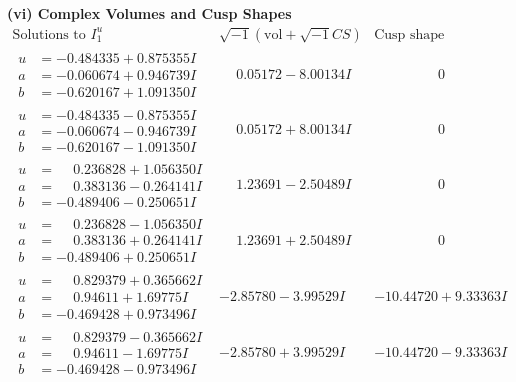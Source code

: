 \documentclass[1p]{elsarticle_modified}
\theoremstyle{definition}
\newcommand{\I}{\sqrt{-1}}
\begin{document}
\newpage\flushleft \textbf{(vi) Complex Volumes and Cusp Shapes}
$$\begin{array}{c|c|c}  
\text{Solutions to }I^u_{1}& \I (\text{vol} + \sqrt{-1}CS) & \text{Cusp shape}\\
 \hline 
\begin{aligned}
u &= -0.484335 + 0.875355 I \\
a &= -0.060674 + 0.946739 I \\
b &= -0.620167 + 1.091350 I\end{aligned}
 & \phantom{-}0.05172 - 8.00134 I & \phantom{-0.000000 } 0 \\ \hline\begin{aligned}
u &= -0.484335 - 0.875355 I \\
a &= -0.060674 - 0.946739 I \\
b &= -0.620167 - 1.091350 I\end{aligned}
 & \phantom{-}0.05172 + 8.00134 I & \phantom{-0.000000 } 0 \\ \hline\begin{aligned}
u &= \phantom{-}0.236828 + 1.056350 I \\
a &= \phantom{-}0.383136 - 0.264141 I \\
b &= -0.489406 - 0.250651 I\end{aligned}
 & \phantom{-}1.23691 - 2.50489 I & \phantom{-0.000000 } 0 \\ \hline\begin{aligned}
u &= \phantom{-}0.236828 - 1.056350 I \\
a &= \phantom{-}0.383136 + 0.264141 I \\
b &= -0.489406 + 0.250651 I\end{aligned}
 & \phantom{-}1.23691 + 2.50489 I & \phantom{-0.000000 } 0 \\ \hline\begin{aligned}
u &= \phantom{-}0.829379 + 0.365662 I \\
a &= \phantom{-}0.94611 + 1.69775 I \\
b &= -0.469428 + 0.973496 I\end{aligned}
 & -2.85780 - 3.99529 I & -10.44720 + 9.33363 I \\ \hline\begin{aligned}
u &= \phantom{-}0.829379 - 0.365662 I \\
a &= \phantom{-}0.94611 - 1.69775 I \\
b &= -0.469428 - 0.973496 I\end{aligned}
 & -2.85780 + 3.99529 I & -10.44720 - 9.33363 I \\ \hline\begin{aligned}

\end{aligned}
\end{array}$$
\end{document}
